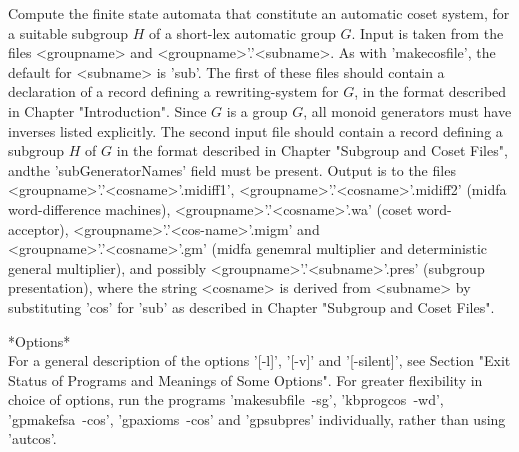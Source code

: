 Compute the finite state automata that constitute an automatic coset system,
for a suitable subgroup $H$ of a short-lex automatic group $G$.
Input is taken from the files <groupname> and <groupname>'.'<subname>.
As with 'makecosfile', the default for <subname> is 'sub'.
The first of these files should contain a declaration of a record defining a
rewriting-system for $G$, in the format described in Chapter "Introduction".
Since $G$ is a group $G$, all monoid generators must have
inverses listed explicitly. The second input file should contain a record
defining a subgroup $H$ of $G$ in the format described in Chapter
"Subgroup and Coset Files", andthe 'subGeneratorNames' field must be present.
Output is to the files <groupname>'.'<cosname>'.midiff1',
<groupname>'.'<cosname>'.midiff2' (midfa word-difference machines),
<groupname>'.'<cosname>'.wa' (coset word-acceptor),
<groupname>'.'<cos-name>'.migm' and <groupname>'.'<cosname>'.gm'
(midfa genemral multiplier and deterministic general multiplier), and
possibly <groupname>'.'<subname>'.pres' (subgroup presentation), where
the string <cosname> is derived from <subname> by substituting
'cos' for 'sub' as described in Chapter "Subgroup and Coset Files".

*Options*\\
For a general description of the options '[-l]', '[-v]' and '[-silent]',
see Section
"Exit Status of Programs and Meanings of Some Options".
For greater flexibility in choice of options, run the programs
'makesubfile\ -sg', 'kbprogcos\ -wd', 'gpmakefsa\ -cos', 'gpaxioms\ -cos' and
'gpsubpres' individually, rather than using 'autcos'. 

